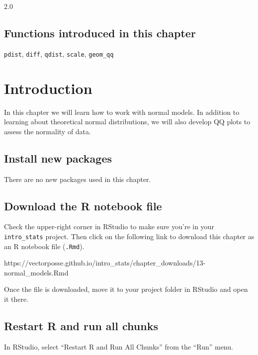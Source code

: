\documentclass[
]{book}
\begin{document}
2.0

\hypertarget{functions-introduced-in-this-chapter-12}{%
\subsection*{Functions introduced in this chapter}\label{functions-introduced-in-this-chapter-12}}

\texttt{pdist}, \texttt{diff}, \texttt{qdist}, \texttt{scale}, \texttt{geom\_qq}

\hypertarget{normal-intro}{%
\section{Introduction}\label{normal-intro}}

In this chapter we will learn how to work with normal models. In addition to learning about theoretical normal distributions, we will also develop QQ plots to assess the normality of data.

\hypertarget{normal-install}{%
\subsection{Install new packages}\label{normal-install}}

There are no new packages used in this chapter.

\hypertarget{normal-download}{%
\subsection{Download the R notebook file}\label{normal-download}}

Check the upper-right corner in RStudio to make sure you're in your \texttt{intro\_stats} project. Then click on the following link to download this chapter as an R notebook file (\texttt{.Rmd}).

https://vectorposse.github.io/intro\_stats/chapter\_downloads/13-normal\_models.Rmd

Once the file is downloaded, move it to your project folder in RStudio and open it there.

\hypertarget{normal-restart}{%
\subsection{Restart R and run all chunks}\label{normal-restart}}

In RStudio, select ``Restart R and Run All Chunks'' from the ``Run'' menu.
\end{document}
